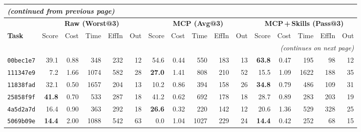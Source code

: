 \documentclass[10pt]{article}
\begin{document}
\begin{longtable}{@{}
    l
    | r r r r r
    | r r r r r
    | r r r r r
  @{}}
\multicolumn{16}{l}{\footnotesize\itshape (continued from previous page)}\\[2pt]
\toprule
& \multicolumn{5}{c|}{\cellcolor{rawbg}\textbf{Raw (Worst@3)}}
& \multicolumn{5}{c|}{\cellcolor{mcpbg}\textbf{MCP (Avg@3)}}
& \multicolumn{5}{c}{\cellcolor{skillsbg}\textbf{MCP\,+\,Skills (Pass@3)}} \\
\cmidrule(lr){2-6}\cmidrule(lr){7-11}\cmidrule(lr){12-16}
\textbf{Task}
  & Score & Cost & Time & EffIn & Out
  & Score & Cost & Time & EffIn & Out
  & Score & Cost & Time & EffIn & Out \\
\midrule
\endhead

\midrule
\multicolumn{16}{r}{\footnotesize\itshape (continues on next page)}\\
\endfoot

\bottomrule
\endlastfoot

%

\texttt{00bec1e7}
  & 39.1 & 0.88 & 348  & 232 &  12
  & 54.6 & 0.44 & 550  & 183 &  13
  & \textbf{63.8} & 0.47 & 195 &  98 &  12 \\

\texttt{111347e9}
  &  7.2 & 1.66 & 1074 & 582 &  28
  & \textbf{27.0} & 1.41 & 808  & 210 &  52
  & 15.5 & 1.09 & 1622 & 188 &  35 \\

\texttt{11838fad}
  & 32.1 & 0.50 & 1657 & 204 &  13
  & 10.2 & 0.86 & 394  & 158 &  26
  & \textbf{34.8} & 0.79 & 486  & 109 &  31 \\

\texttt{25858f9f}
  & \textbf{41.8} & 0.70 & 533  & 287 &  18
  & 41.2 & 0.62 & 692  & 178 &  18
  & 28.7 & 0.89 & 283  & 203 &  19 \\

\texttt{4a5d2a7d}
  & 16.4 & 0.90 & 363  & 292 &  18
  & \textbf{26.6} & 0.32 & 220  & 142 &  12
  & 20.6 & 1.36 & 529  & 328 &  25 \\

\texttt{5069b09e}
  & \textbf{14.4} & 2.00 & 1088 & 542 &  63
  &  0.0 & 1.04 & 1027 & 229 &  24
  & \textbf{14.4} & 0.42 & 252  &  68 &  15 \\  %


\end{longtable}
\end{document}
